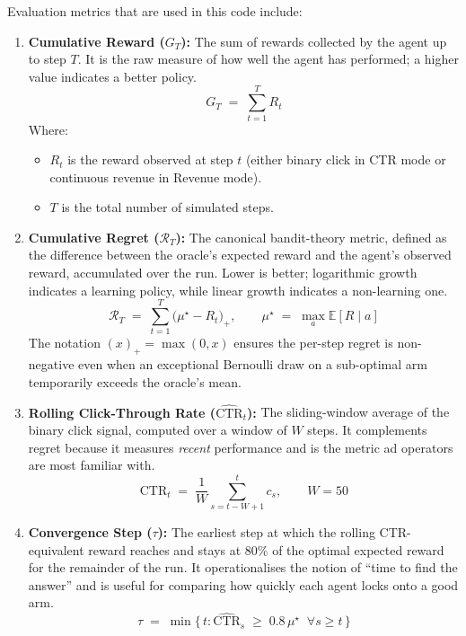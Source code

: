 \noindent Evaluation metrics that are used in this code include:

\begin{enumerate}
\item \textbf{Cumulative Reward ($G_T$):} The sum of rewards collected by the agent up to step $T$. It is the raw measure of how well the agent has performed; a higher value indicates a better policy.
\begin{equation}
G_T \;=\; \sum_{t=1}^{T} R_t
\label{eq:reward}
\end{equation}
Where:
\begin{itemize}
  \item $R_t$ is the reward observed at step $t$ (either binary click in CTR mode or continuous revenue in Revenue mode).
  \item $T$ is the total number of simulated steps.
\end{itemize}

\item \textbf{Cumulative Regret ($\mathcal{R}_T$):} The canonical bandit-theory metric, defined as the difference between the oracle's expected reward and the agent's observed reward, accumulated over the run. Lower is better; logarithmic growth indicates a learning policy, while linear growth indicates a non-learning one.
\begin{equation}
\mathcal{R}_T \;=\; \sum_{t=1}^{T} \bigl(\mu^\star - R_t\bigr)_+, \qquad \mu^\star \;=\; \max_a \mathbb{E}[R \mid a]
\label{eq:regret}
\end{equation}
The notation $(x)_+ = \max(0, x)$ ensures the per-step regret is non-negative even when an exceptional Bernoulli draw on a sub-optimal arm temporarily exceeds the oracle's mean.

\item \textbf{Rolling Click-Through Rate ($\widehat{\text{CTR}}_t$):} The sliding-window average of the binary click signal, computed over a window of $W$ steps. It complements regret because it measures \emph{recent} performance and is the metric ad operators are most familiar with.
\begin{equation}
\widehat{\text{CTR}}_t \;=\; \frac{1}{W} \sum_{s=t-W+1}^{t} c_s, \qquad W = 50
\label{eq:rollingctr}
\end{equation}

\item \textbf{Convergence Step ($\tau$):} The earliest step at which the rolling CTR-equivalent reward reaches and stays at $80\%$ of the optimal expected reward for the remainder of the run. It operationalises the notion of ``time to find the answer'' and is useful for comparing how quickly each agent locks onto a good arm.
\begin{equation}
\tau \;=\; \min \bigl\{\, t : \widehat{\text{CTR}}_s \;\ge\; 0.8\,\mu^\star \;\; \forall s \ge t \,\bigr\}
\label{eq:converge}
\end{equation}


\end{enumerate}
